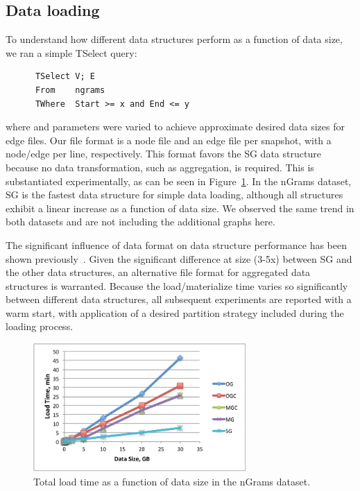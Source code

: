 \subsection{Data loading}

To understand how different data structures perform as a function of
data size, we ran a simple TSelect query:

\begin{small}
\begin{verbatim}
      TSelect V; E
      From    ngrams
      TWhere  Start >= x and End <= y
\end{verbatim}
\end{small}

\noindent where  and  parameters were varied to
achieve approximate desired data sizes for edge files.  Our file
format is a node file and an edge file per snapshot, with a node/edge
per line, respectively.  This format favors the SG data structure
because no data transformation, such as aggregation, is required.
This is substantiated experimentally, as can be seen in
Figure~\ref{fig:tselect}.  In the nGrams dataset, SG is the fastest
data structure for simple data loading, although all structures
exhibit a linear increase as a function of data size.  We observed the
same trend in both datasets and are not including the additional
graphs here. 

The significant influence of data format on data structure performance
has been shown previously~\cite{DBLP:journals/tos/MiaoHLWYZPCC15}.
Given the significant difference at size (3-5x) between SG and the
other data structures, an alternative file format for aggregated data
structures is warranted.  Because the load/materialize time varies so
significantly between different data structures, all subsequent
experiments are reported with a warm start, with application of a
desired partition strategy included during the loading process.

\begin{figure}[t!]
\includegraphics[width=3.2in]{figs/tselect.pdf}
\caption{Total load time as a function of data size in the nGrams
  dataset.}
\label{fig:tselect}
\end{figure}

